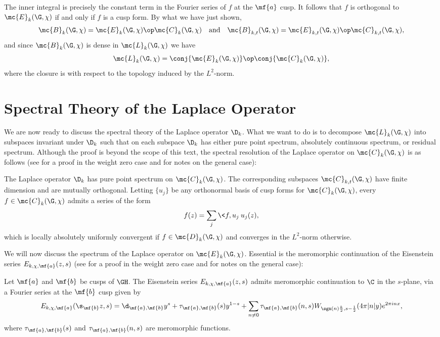     The inner integral is precisely the constant term in the Fourier series of $f$ at the $\mf{a}$ cusp. It follows that $f$ is orthogonal to $\mc{E}_{k}(\G,\chi)$ if and only if $f$ is a cusp form. By what we have just shown,
    \[
      \mc{B}_{k}(\G,\chi) = \mc{E}_{k}(\G,\chi) \op \mc{C}_{k}(\G,\chi) \quad \text{and} \quad \mc{B}_{k,t}(\G,\chi) = \mc{E}_{k,t}(\G,\chi) \op \mc{C}_{k,t}(\G,\chi),
    \]
    and since $\mc{B}_{k}(\G,\chi)$ is dense in $\mc{L}_{k}(\G,\chi)$ we have
    \[
      \mc{L}_{k}(\G,\chi) = \conj{\mc{E}_{k}(\G,\chi)} \op \conj{\mc{C}_{k}(\G,\chi)},
    \]
    where the closure is with respect to the topology induced by the $L^{2}$-norm.
  \section{Spectral Theory of the Laplace Operator}
    We are now ready to discuss the spectral theory of the Laplace operator $\D_{k}$. What we want to do is to decompose $\mc{L}_{k}(\G,\chi)$ into subspaces invariant under $\D_{k}$ such that on each subspace $\D_{k}$ has either pure point spectrum, absolutely continuous spectrum, or residual spectrum. Although the proof is beyond the scope of this text, the spectral resolution of the Laplace operator on $\mc{C}_{k}(\G,\chi)$ is as follows (see \cite{iwaniec2002spectral} for a proof in the weight zero case and \cite{cohenmodular2017} for notes on the general case):

    \begin{theorem}\label{thm:cusp_form_spectrum}
      The Laplace operator $\D_{k}$ has pure point spectrum on $\mc{C}_{k}(\G,\chi)$. The corresponding subspaces $\mc{C}_{k,t}(\G,\chi)$ have finite dimension and are mutually orthogonal. Letting $\{u_{j}\}$ be any orthonormal basis of cusp forms for $\mc{C}_{k}(\G,\chi)$, every $f \in \mc{C}_{k}(\G,\chi)$ admits a series of the form
      \[
        f(z) = \sum_{j}\<f,u_{j}\>u_{j}(z),
      \]
      which is locally absolutely uniformly convergent if $f \in \mc{D}_{k}(\G,\chi)$ and converges in the $L^{2}$-norm otherwise.
    \end{theorem}

    We will now discuss the spectrum of the Laplace operator on $\mc{E}_{k}(\G,\chi)$. Essential is the meromorphic continuation of the Eisenstein series $E_{k,\chi,\mf{a}}(z,s)$ (see \cite{iwaniec2002spectral} for a proof in the weight zero case and \cite{cohenmodular2017} for notes on the general case):

    \begin{theorem}\label{thm:meromorphic_continuation_of_Eisenstein_series}
      Let $\mf{a}$ and $\mf{b}$ be cusps of $\GH$. The Eisenstein series $E_{k,\chi,\mf{a}}(z,s)$ admits meromorphic continuation to $\C$ in the $s$-plane, via a Fourier series at the $\mf{b}$ cusp given by
      \[
        E_{k,\chi,\mf{a}}(\s_{\mf{b}}z,s) = \d_{\mf{a},\mf{b}}y^{s}+\tau_{\mf{a},\mf{b}}(s)y^{1-s}+\sum_{n \neq 0}\tau_{\mf{a},\mf{b}}(n,s)W_{\sgn(n)\frac{k}{2},s-\frac{1}{2}}(4\pi|n|y)e^{2\pi inx},
      \]
      where $\tau_{\mf{a},\mf{b}}(s)$ and $\tau_{\mf{a},\mf{b}}(n,s)$ are meromorphic functions.
    \end{theorem}

